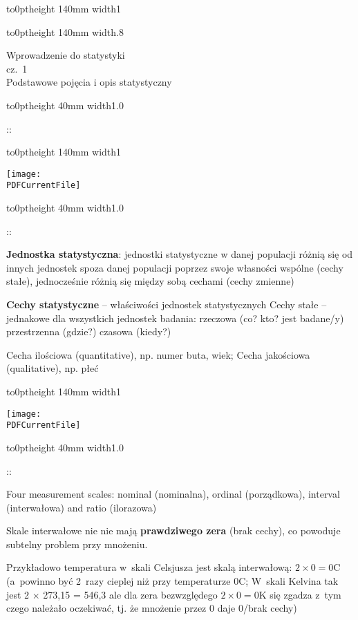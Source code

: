 \documentclass{article}
\def \PDFCurrentFile{stat_w_03.pdf}
\newenvironment{slide}[1]{%
  {\color{green}\vbox to0pt{\noindent \vrule height 140mm width1\textwidth\vss}}
  \vspace{3mm}%
\noindent%
\begin{minipage}{.9\textwidth}
\texttt{[image: \\PDFCurrentFile]}
\end{minipage}%
\par
{\color{orange}\vbox to0pt{\noindent \vrule height 40mm width1.0\textwidth\vss}}
\begin{minipage}{.9\textwidth}
  \thepage::\par
}{\end{minipage}\par
\clearpage}
\newenvironment{xslide}[2]{%
  {\color{green}\vbox to0pt{\noindent \vrule height 140mm width1\textwidth\vss}}
  \vspace{3mm}%
\noindent%
\begin{minipage}{.9\textwidth}#1
\end{minipage}%
\par
{\color{orange}\vbox to0pt{\noindent \vrule height 40mm width1.0\textwidth\vss}}
\begin{minipage}{.9\textwidth}#2
  \thepage::\par
}{\end{minipage}\par
\clearpage}
\begin{document}


\begin{xslide}{
    {\color{white}\vbox to0pt{\noindent \vrule height 140mm width.8\textwidth\vss}}
    \begin{minipage}{.8\textwidth}
      \vspace{30mm}
      \begin{center}
        \begin{Huge}
      Wprowadzenie do statystyki\\
      \large cz.~1\\[1mm]
      \Large
      Podstawowe pojęcia i opis statystyczny
        \end{Huge}
      \end{center}
      \vspace{44mm}
    \end{minipage}
  }{}
\end{xslide}  


\def \PDFCurrentFile{stat_w_03.pdf}



\begin{slide}{2}
\textbf{Jednostka statystyczna}: jednostki statystyczne w danej populacji różnią się od innych jednostek
spoza danej populacji poprzez swoje własności wspólne (cechy stałe), 
jednocześnie różnią się między sobą cechami (cechy zmienne)

\textbf{Cechy statystyczne} -- właściwości jednostek statystycznych
Cechy stałe -- jednakowe dla wszystkich jednostek badania: rzeczowa
(co? kto? jest badane/y) przestrzenna (gdzie?)  czasowa (kiedy?)

Cecha ilościowa (quantitative), np. numer buta, wiek;
Cecha jakościowa (qualitative), np. płeć

\end{slide}

\begin{slide}{3}
Four measurement scales: nominal (nominalna), ordinal (porządkowa), interval (interwałowa) and ratio (ilorazowa)

Skale interwałowe nie nie mają \textbf{prawdziwego zera} (brak cechy), co powoduje subtelny problem przy mnożeniu.

Przykładowo temperatura w~skali Celsjusza jest skalą interwałową: $2 \times 0 = 0$C (a~powinno być 2 razy cieplej niż przy temperaturze $0$C;
W skali Kelvina tak jest 2 $\times$ 273,15 = 546,3 ale dla zera bezwzględego $2 \times 0 = 0$K się zgadza z tym czego należało oczekiwać,
tj. że mnożenie przez $0$ daje $0$/brak cechy)

\end{slide}
\end{document}
